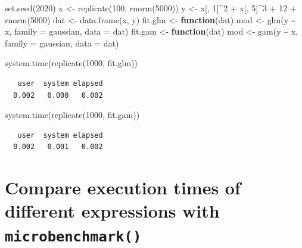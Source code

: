 \documentclass[
]{book}
\newenvironment{Shaded}{\begin{snugshade}}{\end{snugshade}}
\newcommand{\AttributeTok}[1]{\textcolor[rgb]{0.77,0.63,0.00}{#1}}
\newcommand{\ControlFlowTok}[1]{\textcolor[rgb]{0.13,0.29,0.53}{\textbf{#1}}}
\newcommand{\DecValTok}[1]{\textcolor[rgb]{0.00,0.00,0.81}{#1}}
\newcommand{\FunctionTok}[1]{\textcolor[rgb]{0.00,0.00,0.00}{#1}}
\newcommand{\NormalTok}[1]{#1}
\newcommand{\OtherTok}[1]{\textcolor[rgb]{0.56,0.35,0.01}{#1}}
\newcommand{\SpecialCharTok}[1]{\textcolor[rgb]{0.00,0.00,0.00}{#1}}
\begin{document}
\begin{Shaded}
\begin{Highlighting}[]
\FunctionTok{set.seed}\NormalTok{(}\DecValTok{2020}\NormalTok{)}
\NormalTok{x }\OtherTok{\textless{}{-}} \FunctionTok{replicate}\NormalTok{(}\DecValTok{100}\NormalTok{, }\FunctionTok{rnorm}\NormalTok{(}\DecValTok{5000}\NormalTok{))}
\NormalTok{y }\OtherTok{\textless{}{-}}\NormalTok{ x[, }\DecValTok{1}\NormalTok{]}\SpecialCharTok{\^{}}\DecValTok{2} \SpecialCharTok{+}\NormalTok{ x[, }\DecValTok{5}\NormalTok{]}\SpecialCharTok{\^{}}\DecValTok{3} \SpecialCharTok{+} \DecValTok{12} \SpecialCharTok{+} \FunctionTok{rnorm}\NormalTok{(}\DecValTok{5000}\NormalTok{)}
\NormalTok{dat }\OtherTok{\textless{}{-}} \FunctionTok{data.frame}\NormalTok{(x, y)}
\NormalTok{fit.glm }\OtherTok{\textless{}{-}} \ControlFlowTok{function}\NormalTok{(dat) mod }\OtherTok{\textless{}{-}} \FunctionTok{glm}\NormalTok{(y }\SpecialCharTok{\textasciitilde{}}\NormalTok{ x, }\AttributeTok{family =}\NormalTok{ gaussian, }\AttributeTok{data =}\NormalTok{ dat)}
\NormalTok{fit.gam }\OtherTok{\textless{}{-}} \ControlFlowTok{function}\NormalTok{(dat) mod }\OtherTok{\textless{}{-}} \FunctionTok{gam}\NormalTok{(y }\SpecialCharTok{\textasciitilde{}}\NormalTok{ x, }\AttributeTok{family =}\NormalTok{ gaussian, }\AttributeTok{data =}\NormalTok{ dat)}
    
\FunctionTok{system.time}\NormalTok{(}\FunctionTok{replicate}\NormalTok{(}\DecValTok{1000}\NormalTok{, fit.glm))}
\end{Highlighting}
\end{Shaded}

\begin{verbatim}
   user  system elapsed 
  0.002   0.000   0.002 
\end{verbatim}

\begin{Shaded}
\begin{Highlighting}[]
\FunctionTok{system.time}\NormalTok{(}\FunctionTok{replicate}\NormalTok{(}\DecValTok{1000}\NormalTok{, fit.gam))}
\end{Highlighting}
\end{Shaded}

\begin{verbatim}
   user  system elapsed 
  0.002   0.001   0.002 
\end{verbatim}

\hypertarget{compare-execution-times-of-different-expressions-with-microbenchmark}{%
\section{\texorpdfstring{Compare execution times of different expressions with \texttt{microbenchmark()}}{Compare execution times of different expressions with microbenchmark()}}\label{compare-execution-times-of-different-expressions-with-microbenchmark}}
\end{document}
